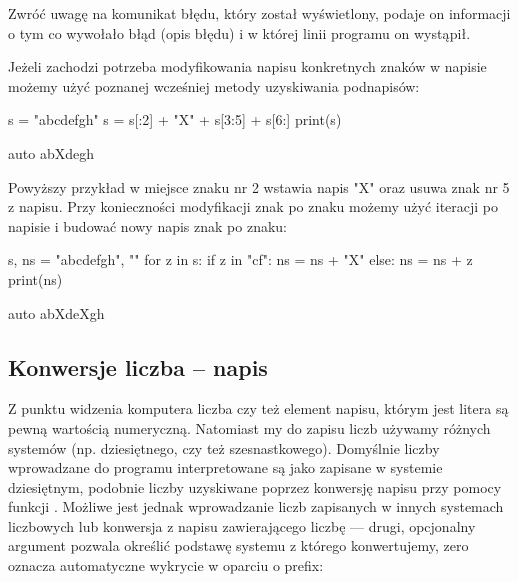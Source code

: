 Zwróć uwagę na komunikat błędu, który został wyświetlony, podaje on informacji o tym co wywołało błąd (opis błędu) i w  której linii programu on wystąpił.


Jeżeli zachodzi potrzeba modyfikowania napisu konkretnych znaków w napisie możemy użyć poznanej wcześniej metody uzyskiwania podnapisów:

\begin{CodeFrame}[python]{0.50\textwidth}
s = "abcdefgh"
s = s[:2] + "X" + s[3:5] + s[6:]
print(s)
\end{CodeFrame}
\begin{CodeFrame}{auto}
abXdegh
\end{CodeFrame}

Powyższy przykład w miejsce znaku nr 2 wstawia napis "X" oraz usuwa znak nr 5 z napisu.
Przy konieczności modyfikacji znak po znaku możemy użyć iteracji po napisie i budować nowy napis znak po znaku:

\begin{CodeFrame}[python]{0.50\textwidth}
s, ns = "abcdefgh", ""
for z in s:
    if z in "cf":
        ns = ns + "X"
    else:
        ns = ns + z
print(ns)
\end{CodeFrame}
\begin{CodeFrame}{auto}
abXdeXgh
\end{CodeFrame}

\subsection{Konwersje liczba -- napis}

Z punktu widzenia komputera liczba czy też element napisu, którym jest litera są pewną wartością numeryczną.
Natomiast my do zapisu liczb używamy różnych systemów (np. dziesiętnego, czy też szesnastkowego).
Domyślnie liczby wprowadzane do programu interpretowane są jako zapisane w systemie dziesiętnym,
podobnie liczby uzyskiwane poprzez konwersję napisu przy pomocy funkcji .
Możliwe jest jednak wprowadzanie liczb zapisanych w innych systemach liczbowych lub konwersja z napisu zawierającego liczbę ---
drugi, opcjonalny argument \python{int()} pozwala określić podstawę systemu z którego konwertujemy, zero oznacza automatyczne wykrycie w oparciu o prefix:

